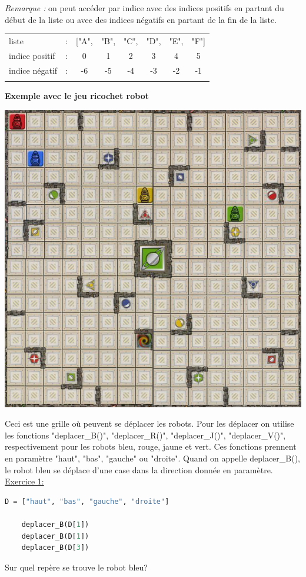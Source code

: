 \textit{Remarque :} on peut accéder par indice avec des indices positifs en partant du début de la liste ou avec des indices négatifs en partant de la fin de la liste.

    \begin{tabular}{l c c c c c c c}
        liste & : &["A", & "B", & "C", & "D", & "E", &"F"]\\
        indice positif & : & 0 & 1 & 2 & 3 & 4 & 5\\
        indice négatif & : & -6 & -5 & -4 & -3 & -2 & -1\\
        \\
    \end{tabular}

\newpage
\textbf{Exemple avec le jeu ricochet robot}
\begin{center}
    \includegraphics[width=0.7\linewidth]{Thème 1 – Structures de données/Chapitre 1 - Interface et implémentation/BLOB/ricochet-robots-plateau}
\end{center}
Ceci est une grille où peuvent se déplacer les robots. Pour les déplacer on utilise les fonctions "deplacer\_B()", "deplacer\_R()", "deplacer\_J()", "deplacer\_V()", respectivement pour les robots bleu, rouge, jaune et vert.
Ces fonctions prennent en paramètre "haut", "bas", "gauche" ou "droite". Quand on appelle deplacer\_B(), le robot bleu se déplace d'une case dans la direction donnée en paramètre.\\


\underline{Exercice 1:}
\begin{lstlisting}[language=Python]
    D = ["haut", "bas", "gauche", "droite"]

    deplacer_B(D[1])
    deplacer_B(D[1])
    deplacer_B(D[3])
\end{lstlisting}
Sur quel repère se trouve le robot bleu?\\

